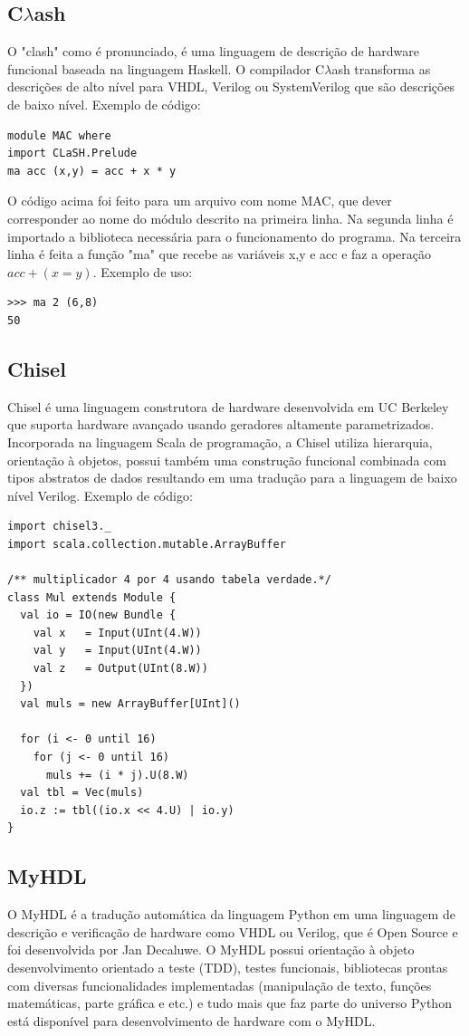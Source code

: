 \documentclass[12pt,a4paper]{article}
\begin{document}
\subsection{C$\lambda$ash}
O "clash" como é pronunciado, é uma linguagem de descrição de hardware funcional baseada na linguagem Haskell. O compilador C$\lambda$ash transforma as descrições de alto nível para VHDL, Verilog ou SystemVerilog que são descrições de baixo nível. Exemplo de código:
\begin{verbatim}
module MAC where
import CLaSH.Prelude
ma acc (x,y) = acc + x * y
\end{verbatim}
O código acima foi feito para um arquivo com nome MAC, que dever corresponder ao nome do módulo descrito na primeira linha. Na segunda linha é importado a biblioteca necessária para o funcionamento do programa. Na terceira linha é feita a função "ma" que recebe as variáveis x,y e acc e faz a operação $acc + (x = y)$. Exemplo de uso:
\begin{verbatim}
>>> ma 2 (6,8)
50
\end{verbatim}

\subsection{Chisel}
Chisel é uma linguagem construtora de hardware desenvolvida em UC Berkeley que suporta hardware avançado usando geradores altamente parametrizados. Incorporada na linguagem Scala de programação, a Chisel utiliza hierarquia, orientação à objetos, possui também uma construção funcional combinada com tipos abstratos de dados resultando em uma tradução para a linguagem de baixo nível Verilog. Exemplo de código:
\begin{verbatim}
import chisel3._
import scala.collection.mutable.ArrayBuffer

/** multiplicador 4 por 4 usando tabela verdade.*/
class Mul extends Module {
  val io = IO(new Bundle {
    val x   = Input(UInt(4.W))
    val y   = Input(UInt(4.W))
    val z   = Output(UInt(8.W))
  })
  val muls = new ArrayBuffer[UInt]()

  for (i <- 0 until 16)
    for (j <- 0 until 16)
      muls += (i * j).U(8.W)
  val tbl = Vec(muls)
  io.z := tbl((io.x << 4.U) | io.y)
}
\end{verbatim}

\subsection{MyHDL}
O MyHDL é a tradução automática da linguagem Python em uma linguagem de descrição e verificação de hardware como VHDL ou Verilog, que é Open Source e foi desenvolvida por Jan Decaluwe. O MyHDL possui orientação à objeto desenvolvimento orientado a teste (TDD), testes funcionais, bibliotecas  prontas com diversas funcionalidades implementadas (manipulação de texto, funções matemáticas, parte gráfica e etc.) e tudo mais que faz parte do universo Python está disponível para desenvolvimento de hardware com o MyHDL.
\end{document}
